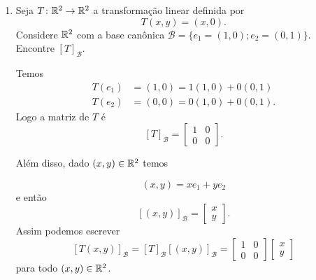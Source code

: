 \begin{exemplos}
    \begin{enumerate}[label={\arabic*})]
        \item Seja $T \colon \mathbb{R}^2 \to \mathbb{R}^2$ a transformação linear definida por
        \[
          T(x,y) = (x,0).
        \]
        Considere $\mathbb{R}^2$ com a base can\^onica $\mathcal{B} = \{e_1=(1,0);e_2=(0,1)\}$. Encontre $[T]_\mathcal{B}$.
        \begin{solucao}
            Temos
            \begin{align*}
                T(e_1) &= (1,0) = 1(1,0) + 0(0,1)\\
                T(e_2) &= (0,0) = 0(1,0) + 0(0,1).
            \end{align*}
            Logo a matriz de $T$ é
            \[
                [T]_\mathcal{B} = \begin{bmatrix}
                1 & 0\\
                0 & 0
                \end{bmatrix}.
            \]

            Além disso, dado $(x,y) \in \mathbb{R}^2$ temos

            \[
                (x,y) = xe_1 + ye_2
            \]
            e então
            \[
                [(x,y)]_\mathcal{B} = \begin{bmatrix}
                x\\y
                \end{bmatrix}.
            \]
            Assim podemos escrever
            \[
                [T(x,y)]_\mathcal{B} = [T]_\mathcal{B}[(x,y)]_\mathcal{B} = \begin{bmatrix}
                1 & 0\\
                0 & 0
                \end{bmatrix}\begin{bmatrix}
                x\\y
                \end{bmatrix}
            \]
            para todo $(x,y) \in \mathbb{R}^2$.
        \end{solucao}


\end{enumerate}
\end{exemplos}
